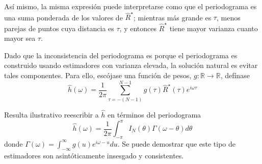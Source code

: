 \documentclass[12pt,letterpaper]{book}
\newcommand{\R}{\mathbb{R}}
\newcommand{\intR}{\int_{-\infty}^{\infty}}
\newcommand{\intPI}{\int_{-\pi}^{\pi}}
\begin{document}
Así mismo, la misma expresión puede interpretarse como que el periodograma es una suma ponderada de los valores de $\widehat{R}^{\star}$; mientras más grande es $\tau$, menos parejas de puntos cuya distancia es $\tau$, y entonces $\widehat{R}^{\star}$ tiene mayor varianza cuanto mayor sea $\tau$. 

Dado que la inconsistencia del periodograma es porque el periodograma es construido usando estimadores con varianza elevada, la solución natural es evitar tales componentes. Para ello, escójase una función de pesos, $g: \R \rightarrow \R$, defínase
%
\begin{equation}
\widehat{h}(\omega) = \frac{1}{2 \pi} \sum_{\tau = -(N-1)}^{N-1} g(\tau) \widehat{R}^{\star}(\tau) 
e^{i \omega \tau} 
\label{txt_estimador}
\end{equation}

Resulta ilustrativo reescribir a $\widehat{h}$ en términos del periodograma
\begin{equation*}
\widehat{h}(\omega) = \frac{1}{2 \pi} \intPI I_N(\theta) \Gamma(\omega - \theta) d\theta
\end{equation*}
donde $\Gamma(\omega) = \intR g(u) e^{i \omega -u } du$.
%
Se puede demostrar que este tipo de estimadores son asintóticamente insesgado y consistentes.
\end{document}
